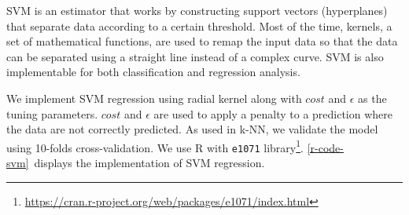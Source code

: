 



	\ac{SVM} is an estimator that works by constructing support vectors (hyperplanes) that separate data according to a certain threshold. Most of the time, kernels, a set of mathematical functions, are used to remap the input data so that the data can be separated using a straight line instead of a complex curve. \ac{SVM} is also implementable for both classification and regression analysis.

	We implement \ac{SVM} regression using radial kernel along with $cost$ and $\epsilon$ as the tuning parameters. $cost$ and $\epsilon$ are used to apply a penalty to a prediction where the data are not correctly predicted. As used in \ac{k-NN}, we validate the model using 10-folds cross-validation. We use R with \verb|e1071| library\footnote{\url{https://cran.r-project.org/web/packages/e1071/index.html}}. \autoref{r-code-svm}~displays the implementation of \ac{SVM} regression.

